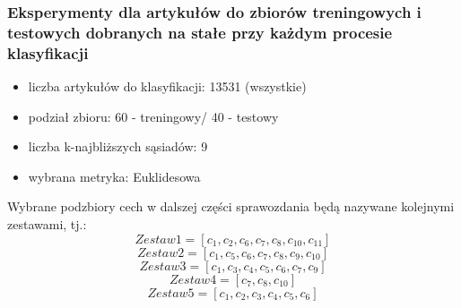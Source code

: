 \documentclass{classrep}
\begin{document}
\subsubsection{Eksperymenty dla artykułów do zbiorów treningowych i testowych dobranych na stałe przy każdym procesie klasyfikacji}
\begin{itemize}
    \item liczba artykułów do klasyfikacji: 13531 (wszystkie)
    \item podział zbioru: 60 - treningowy/ 40 - testowy    
    \item liczba k-najbliższych sąsiadów: 9 
    \item wybrana metryka: Euklidesowa
\end{itemize}
Wybrane podzbiory cech w dalszej części sprawozdania będą nazywane kolejnymi zestawami, tj.:
\begin{equation}
   Zestaw1 = [c_{1}, c_{2}, c_{6}, c_{7}, c_{8}, c_{10}, c_{11}]
\end{equation}
\begin{equation}
   Zestaw2 = [c_{1}, c_{5}, c_{6}, c_{7}, c_{8}, c_{9}, c_{10}]
\end{equation}
\begin{equation}
   Zestaw3 = [c_{1}, c_{3}, c_{4}, c_{5}, c_{6}, c_{7}, c_{9}]
\end{equation}
\begin{equation}
   Zestaw4 = [c_{7}, c_{8}, c_{10}]
\end{equation}
\begin{equation}
   Zestaw5 = [c_{1}, c_{2}, c_{3}, c_{4}, c_{5}, c_{6}]
\end{equation}
\end{document}
